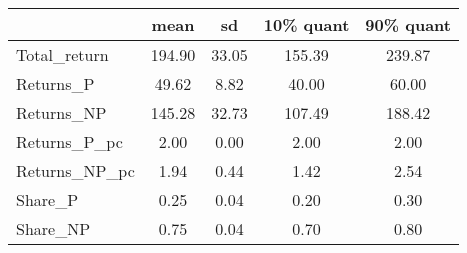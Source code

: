 \begin{tabular}{lcccc}
\toprule
{} &    mean &     sd &  10\% quant &  90\% quant \\
\midrule
Total\_return  &  194.90 &  33.05 &     155.39 &     239.87 \\
Returns\_P     &   49.62 &   8.82 &      40.00 &      60.00 \\
Returns\_NP    &  145.28 &  32.73 &     107.49 &     188.42 \\
Returns\_P\_pc  &    2.00 &   0.00 &       2.00 &       2.00 \\
Returns\_NP\_pc &    1.94 &   0.44 &       1.42 &       2.54 \\
Share\_P       &    0.25 &   0.04 &       0.20 &       0.30 \\
Share\_NP      &    0.75 &   0.04 &       0.70 &       0.80 \\
\bottomrule
\end{tabular}
